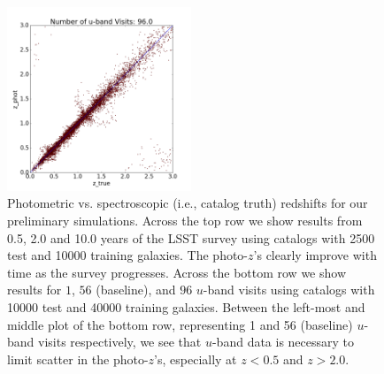 \begin{figure}[h]
\begin{center}
\includegraphics[width=5.5cm]{figs/photoz/uvisits_cat6.png}
\caption{Photometric vs. spectroscopic (i.e., catalog truth) redshifts for our preliminary simulations. Across the top row we show results from 0.5, 2.0 and 10.0 years of the LSST survey using catalogs with 2500 test and 10000 training galaxies. The photo-$z$'s clearly improve with time as the survey progresses. Across the bottom row we show results for $1$, $56$ (baseline), and $96$ $u$-band visits using catalogs with 10000 test and 40000 training galaxies. Between the left-most and middle plot of the bottom row, representing 1 and 56 (baseline) $u$-band visits respectively, we see that $u$-band data is necessary to limit scatter in the photo-$z$'s, especially at $z<0.5$ and $z>2.0$. \label{fig:redshifts}}
\end{center}
\end{figure}

